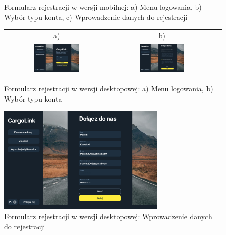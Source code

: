 \begin{figure}[H]
\begin{tabular}{@{}ccc@{}}
  \end{tabular}
 \caption{Formularz rejestracji w wersji mobilnej: a) Menu logowania, b) Wybór typu konta, c) Wprowadzenie danych do rejestracji}
 \label{fig:Formularz rejestracji - abc - mobile}
\end{figure}
\begin{figure}[H]
 \centering
  \begin{tabular}{@{}ccc@{}}
  a) & b)\\
  \includegraphics[width=0.45\textwidth]{rozdzial1/logowanie_d.jpg} &
  \includegraphics[width=0.45\textwidth]{rozdzial1/wybor_1_d.jpg}
  \end{tabular}
 \caption{Formularz rejestracji w wersji desktopowej: a) Menu logowania, b) Wybór typu konta}
 \label{fig:Formularz rejestracji - ab - desktop}
\end{figure}
\begin{figure}[H]
 \centering
  \includegraphics[width=0.7\textwidth]{rozdzial1/rejestracja_d.jpg}
 \caption{Formularz rejestracji w wersji desktopowej: Wprowadzenie danych do rejestracji}
 \label{fig:Formularz rejestracji - c - desktop}
\end{figure}
